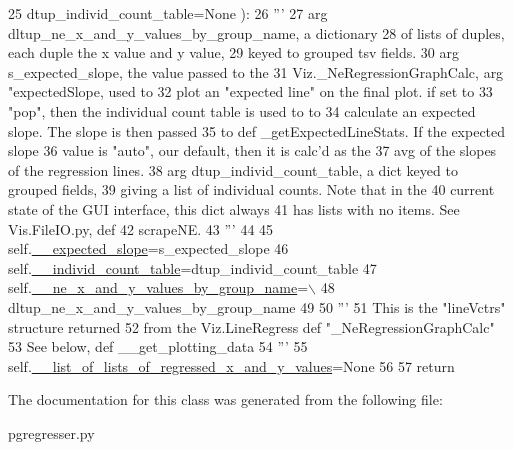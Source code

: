 \begin{DoxyCode}
25                     dtup\_individ\_count\_table=\textcolor{keywordtype}{None} ):
26         \textcolor{stringliteral}{'''}
27 \textcolor{stringliteral}{        arg dltup\_ne\_x\_and\_y\_values\_by\_group\_name, a dictionary}
28 \textcolor{stringliteral}{            of lists of duples, each duple the x value and y value,}
29 \textcolor{stringliteral}{            keyed to grouped tsv fields.}
30 \textcolor{stringliteral}{        arg s\_expected\_slope, the value passed to the }
31 \textcolor{stringliteral}{            Viz.\_NeRegressionGraphCalc, arg "expectedSlope, used to }
32 \textcolor{stringliteral}{            plot an "expected line" on the final plot.  if set to }
33 \textcolor{stringliteral}{            "pop", then the individual count table is used to to }
34 \textcolor{stringliteral}{            calculate an expected slope.  The slope is then passed}
35 \textcolor{stringliteral}{            to def \_getExpectedLineStats.  If the expected slope }
36 \textcolor{stringliteral}{            value is "auto", our default, then it is calc'd as the}
37 \textcolor{stringliteral}{            avg of the slopes of the regression lines.      }
38 \textcolor{stringliteral}{        arg dtup\_individ\_count\_table, a dict keyed to grouped fields,}
39 \textcolor{stringliteral}{            giving a list of individual counts.  Note that in the }
40 \textcolor{stringliteral}{            current state of the GUI interface, this dict always}
41 \textcolor{stringliteral}{            has lists with no items.  See Vis.FileIO.py, def}
42 \textcolor{stringliteral}{            scrapeNE.}
43 \textcolor{stringliteral}{        '''}
44 
45         self.\hyperlink{classnegui_1_1pgregresser_1_1PGRegresser_a77aded2efa89de116d69608482a73143}{\_\_expected\_slope}=s\_expected\_slope
46         self.\hyperlink{classnegui_1_1pgregresser_1_1PGRegresser_a2aa7da576f4e8b2b242461daa411b04a}{\_\_individ\_count\_table}=dtup\_individ\_count\_table
47         self.\hyperlink{classnegui_1_1pgregresser_1_1PGRegresser_a7031cf822a90bcd431c81a224a4bf81e}{\_\_ne\_x\_and\_y\_values\_by\_group\_name}=\(\backslash\)
48                         dltup\_ne\_x\_and\_y\_values\_by\_group\_name
49     
50         \textcolor{stringliteral}{'''}
51 \textcolor{stringliteral}{        This is the "lineVctrs" structure returned}
52 \textcolor{stringliteral}{        from the Viz.LineRegress def "\_NeRegressionGraphCalc"}
53 \textcolor{stringliteral}{        See below, def \_\_get\_plotting\_data}
54 \textcolor{stringliteral}{        '''}
55         self.\hyperlink{classnegui_1_1pgregresser_1_1PGRegresser_a4814750aca51ff8e27915a29d3d9f1d9}{\_\_list\_of\_lists\_of\_regressed\_x\_and\_y\_values}=\textcolor{keywordtype}{None}
56 
57         \textcolor{keywordflow}{return}
\end{DoxyCode}


The documentation for this class was generated from the following file\+:\begin{DoxyCompactItemize}
\item 
pgregresser.\+py\end{DoxyCompactItemize}

